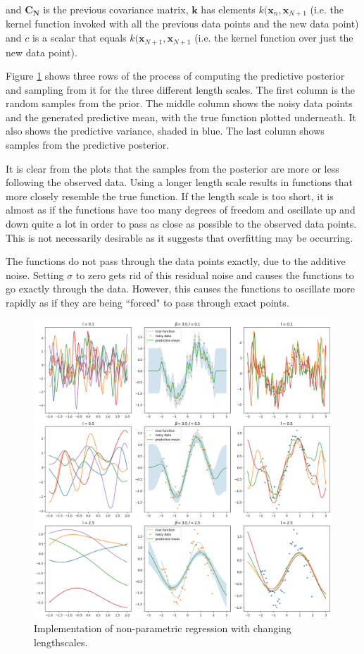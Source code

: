\documentclass[10pt, a4paper, twocolumn]{article} %
\begin{document}
and $\mathbf{C_N}$ is the previous covariance matrix, $\mathbf{k}$ has elements $k(\mathbf{x}_n, \mathbf{x}_{N+1}$ (i.e. the kernel function invoked with all the previous data points and the new data point) and $c$ is a scalar that equals $k(\mathbf{x}_{N+1}, \mathbf{x}_{N+1}$ (i.e. the kernel function over just the new data point).

Figure \ref{fig:q14} shows three rows of the process of computing the predictive posterior and sampling from it for the three different length scales. The first column is the random samples from the prior. The middle column shows the noisy data points and the generated predictive mean, with the true function plotted underneath. It also shows the predictive variance, shaded in blue. The last column shows samples from the predictive posterior.

It is clear from the plots that the samples from the posterior are more or less following the observed data. Using a longer length scale results in functions that more closely resemble the true function. If the length scale is too short, it is almost as if the functions have too many degrees of freedom and oscillate up and down quite a lot in order to pass as close as possible to the observed data points. This is not necessarily desirable as it suggests that overfitting may be occurring.

The functions do not pass through the data points exactly, due to the additive noise. Setting $\sigma$ to zero gets rid of this residual noise and causes the functions to go exactly through the data. However, this causes the functions to oscillate more rapidly as if they are being ``forced" to pass through exact points.

\begin{figure}[!htb]
\centerline{\includegraphics[width=\linewidth]{non_parametric_regression.png}}
\caption{Implementation of non-parametric regression with changing lengthscales. }
\label{fig:q14}
\end{figure}
\end{document}
